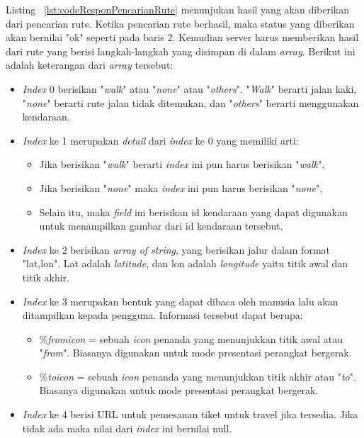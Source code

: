 Listing ~\ref{lst:codeResponPencarianRute} menunjukan hasil yang akan diberikan dari pencarian rute. Ketika pencarian rute berhasil, maka status yang diberikan akan bernilai "ok" seperti pada baris 2. Kemudian server harus memberikan hasil dari rute yang berisi langkah-langkah yang disimpan di dalam \textit{array}. Berikut ini adalah keterangan dari \textit{array} tersebut:

\begin{itemize}
	\item \textit{Index} 0 berisikan "\textit{walk}" atau "\textit{none}" atau "\textit{others}". "\textit{Walk}" berarti jalan kaki, "\textit{none}" berarti rute jalan tidak ditemukan, dan "\textit{others}" berarti menggunakan kendaraan.
	\item \textit{Index} ke 1 merupakan \textit{detail} dari \textit{index} ke 0 yang memiliki arti:
	\begin{itemize}
		\item Jika berisikan "\textit{walk}" berarti \textit{index} ini pun harus berisikan "\textit{walk}",
		\item Jika berisikan "\textit{none}" maka \textit{index} ini pun harus berisikan "\textit{none}",
		\item Selain itu, maka \textit{field} ini berisikan id kendaraan yang dapat digunakan untuk menampilkan gambar dari id kendaraan tersebut.
	\end{itemize}
	\item \textit{Index} ke 2 berisikan \textit{array of string}, yang berisikan jalur dalam format "lat,lon". Lat adalah \textit{latitude}, dan lon adalah \textit{longitude} yaitu titik awal dan titik akhir.
	\item \textit{Index} ke 3 merupakan bentuk yang dapat dibaca oleh manusia lalu akan ditampilkan kepada pengguna. Informasi tersebut dapat berupa:
	\begin{itemize}
		\item \%\textit{fromicon} = sebuah \textit{icon} penanda yang menunjukkan titik awal atau "\textit{from}". Biasanya digunakan untuk mode presentasi perangkat bergerak.
		\item \%\textit{toicon} = sebuah \textit{icon} penanda yang menunjukkan titik akhir atau "\textit{to}". Biasanya digunakan untuk mode presentasi perangkat bergerak.
	\end{itemize}
	\item \textit{Index} ke 4 berisi URL untuk pemesanan tiket untuk travel jika tersedia. Jika tidak ada maka nilai dari \textit{index} ini bernilai null.
\end{itemize}


